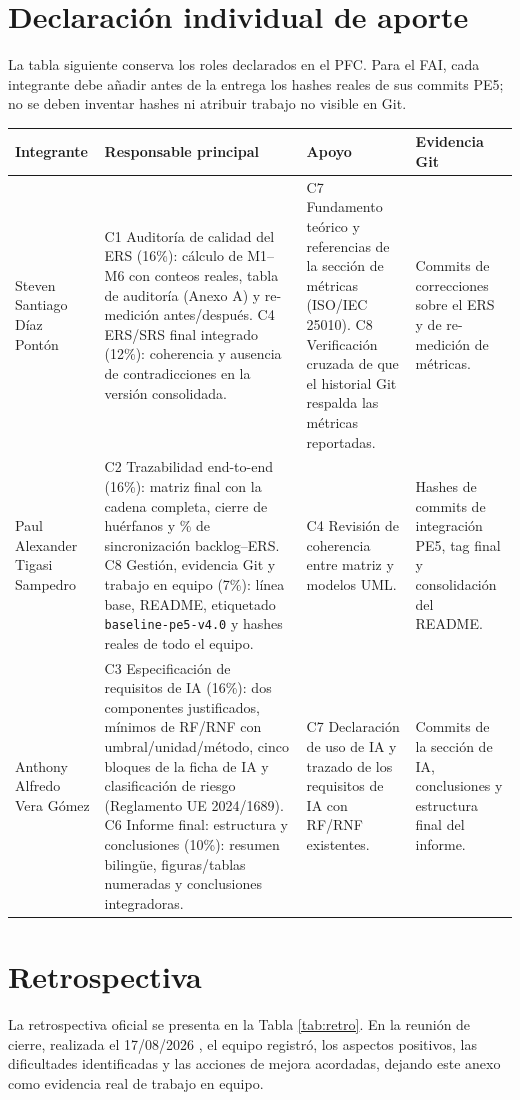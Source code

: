 \documentclass[11pt,a4paper]{article}
\begin{document}
\begin{appendices}
		\section{Declaración individual de aporte}
		La tabla siguiente conserva los roles declarados en el PFC. Para el FAI, cada integrante debe añadir antes de la entrega los hashes reales de sus commits PE5; no se deben inventar hashes ni atribuir trabajo no visible en Git.
		\begin{longtable}{p{3.6cm}p{4.6cm}p{4.6cm}p{2.8cm}}\toprule\textbf{Integrante}&\textbf{Responsable principal}&\textbf{Apoyo}&\textbf{Evidencia Git}\\\midrule\endhead
			Steven Santiago Díaz Pontón&C1 Auditoría de calidad del ERS (16\%): cálculo de M1--M6 con conteos reales, tabla de auditoría (Anexo A) y re-medición antes/después. C4 ERS/SRS final integrado (12\%): coherencia y ausencia de contradicciones en la versión consolidada.&C7 Fundamento teórico y referencias de la sección de métricas (ISO/IEC 25010). C8 Verificación cruzada de que el historial Git respalda las métricas reportadas.&Commits de correcciones sobre el ERS y de re-medición de métricas.\\
			Paul Alexander Tigasi Sampedro&C2 Trazabilidad end-to-end (16\%): matriz final con la cadena completa, cierre de huérfanos y \% de sincronización backlog--ERS. C8 Gestión, evidencia Git y trabajo en equipo (7\%): línea base, README, etiquetado \texttt{baseline-pe5-v4.0} y hashes reales de todo el equipo.&C4 Revisión de coherencia entre matriz y modelos UML.&Hashes de commits de integración PE5, tag final y consolidación del README.\\
			Anthony Alfredo Vera Gómez&C3 Especificación de requisitos de IA (16\%): dos componentes justificados, mínimos de RF/RNF con umbral/unidad/método, cinco bloques de la ficha de IA y clasificación de riesgo (Reglamento UE 2024/1689). C6 Informe final: estructura y conclusiones (10\%): resumen bilingüe, figuras/tablas numeradas y conclusiones integradoras.&C7 Declaración de uso de IA y trazado de los requisitos de IA con RF/RNF existentes.&Commits de la sección de IA, conclusiones y estructura final del informe.\\\bottomrule\end{longtable}
		
		
		\section{Retrospectiva}
		La retrospectiva oficial se presenta en la Tabla \ref{tab:retro}. En la reunión de cierre, realizada el 17/08/2026 , el equipo registró, los aspectos positivos, las dificultades identificadas y las acciones de mejora acordadas, dejando este anexo como evidencia real de trabajo en equipo.
		

\end{appendices}
\end{document}
